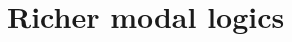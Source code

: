 \documentclass[aspectratio=169]{beamer}
\begin{document}


  




 \section{Richer modal logics}
\end{document}
